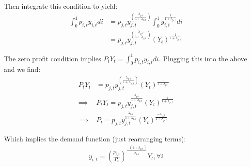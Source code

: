 \documentclass[article,11pt,letterpaper,fleqn]{article}
\theoremstyle{definition}
\numberwithin{equation}{section}
\begin{document}
Then integrate this condition to yield:
\begin{equation}
\begin{split}
\int_{0}^{1}p_{i,t}y_{i,t}di & = p_{j,t}y_{j,t}^{\left(\frac{\lambda_{p,t}}{1+\lambda_{p,t}}\right)}\int_{0}^{1}y_{i,t}^{\frac{1}{1+\lambda_{p,t}}}di  \\
& = p_{j,t}y_{j,t}^{\left(\frac{\lambda_{p,t}}{1+\lambda_{p,t}}\right)}(Y_{t})^{\frac{1}{1+\lambda_{p,t}}}
\end{split}
\end{equation}

The zero profit condition implies $P_{t}Y_{t}=\int_{0}^{1}p_{i,t}y_{i,t}di$.  Plugging this into the above and we find:
\begin{equation}
\begin{split}
P_{t}Y_{t} &= p_{j,t}y_{j,t}^{\left(\frac{\lambda_{p,t}}{1+\lambda_{p,t}}\right)}(Y_{t})^{\frac{1}{1+\lambda_{p,t}}} \\
\implies &P_{t}Y_{t}=p_{j,t}y_{j,t}^{\frac{\lambda_{p,t}}{1+\lambda_{p,t}}}(Y_{t})^{\frac{1}{1+\lambda_{p,t}}} \\
\implies & P_{t} =  p_{j,t}y_{j,t}^{\frac{\lambda_{p,t}}{1+\lambda_{p,t}}}(Y_{t})^{\frac{-\lambda_{p,t}}{1+\lambda_{p,t}}}
\end{split}
\end{equation}

Which implies the demand function (just rearranging terms):
\begin{equation}
\begin{split}
y_{i,t} =  \left(\frac{p_{i,t}}{P_{t}}\right)^{\frac{-(1+\lambda_{p,t})}{\lambda_{p,t}}}Y_{t}, \forall i
\end{split}
\end{equation}
\end{document}

